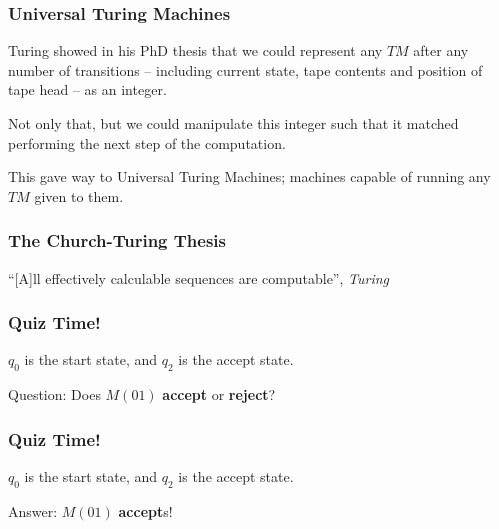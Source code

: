 \documentclass[aspectratio=169]{beamer}
\begin{document}
\begin{frame}
\frametitle{Universal Turing Machines}
Turing showed in his PhD thesis that we could represent any $TM$ after any number of transitions -- including current state, tape contents and position of tape head -- as an integer.

Not only that, but we could manipulate this integer such that it matched performing the next step of the computation.

This gave way to Universal Turing Machines; machines capable of running any $TM$ given to them.
\end{frame}

\begin{frame}
\frametitle{The Church-Turing Thesis}
\centerline{``[A]ll effectively calculable sequences are computable'', {\em Turing}}
\end{frame}

\begin{frame}
\frametitle{Quiz Time!}

\begin{center}
\end{center}

$q_0$ is the start state, and $q_2$ is the accept state.

Question: Does $M(01)$ {\bf accept} or {\bf reject}?
\end{frame}

\begin{frame}
\frametitle{Quiz Time!}

\begin{center}
\end{center}

$q_0$ is the start state, and $q_2$ is the accept state.

Answer: $M(01)$ {\bf accept}s!
\end{frame}
\end{document}
